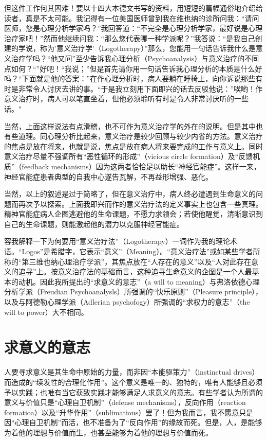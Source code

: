 \documentclass[11pt,oneside]{book}
\begin{document}
\begin{common-format}
但这件工作何其困难！要以十四大本德文书写的资料，用短短的篇幅通俗地介绍给读者，真是不太可能。我记得有一位美国医师曾到我在维也纳的诊所问我：“请问医师，您是心理分析学家吗？”我回答道：“不完全是心理分析学家，最好说是心理治疗家吧！”然而他继续问我：“那么您代表哪一种学派呢？”我答说：“是我自己创建的学说，称为'意义治疗学'（Logotherapy）”那么，您能用一句话告诉我什么是意义治疗学吗？“他又问”至少告诉我心理分析（Psychoanalysis）与意义治疗的不同点如何？“”好吧！“我说；”但是首先请你用一句话告诉我心理分析的本质是什么好吗？“下面就是他的答案：”在作心理分析时，病人要躺在睡椅上，向你诉说那些有时是非常令人讨厌去讲的事。“于是我立刻用下面即兴的话去反驳他说：”唉哟！作意义治疗时，病人可以笔直坐着，但他必须聆听有时是令人非常讨厌听的一些话。"

当然，上面这样说法有点滑稽，也不可作为意义治疗学的外在的说明。但是其中也有些道理。同心理分析比起来，意义治疗是较少回顾与较少内省的方法。意义治疗的焦点是放在将来，也就是说，焦点是放在病人将来要完成的工作与意义上。同时意义治疗尽量不强调所有“恶性循环的形成”（vicious circle formation）及“反馈机质”（feedback mechanisms）因为这两者恰恰足以助长“神经官能症”。这样一来，神经官能症患者典型的自我中心遂告瓦解，不再益形增强、恶化。

当然，以上的叙述是过于简略了，但在意义治疗中，病人终必遭遇到生命意义的问题而再次予以探索。上面我即兴而作的意义治疗法的定义事实上也包含一些真理。精神官能症病人企图逃避他的生命课题，不愿力求领会；若使他醒觉，清晰意识到自己的生命课题，则能激起他的潜力以克服神经官能症。

容我解释一下为何要用“意义治疗法”（Logotherapy）一词作为我的理论术语。“Logos”是希腊字，它表示“意义”（Meaning）。“意义治疗法”或如某些学者所称的“第三维也纳心理治疗学派”，其焦点放在“人存在的意义”以及“人对此存在意义的追寻”上。按意义治疗法的基础而言，这种追寻生命意义的企图是一个人最基本的动机。因此我所提出的“求意义的意志”（a will to meaning）与弗洛依德心理分析学派（Freudian Psychoanalysls）所强调的“快乐原则”（Pleasure principle），以及与阿德勒心理学派（Adlerian psychofogy）所强调的“求权力的意志”（the will to power）大不相同。


\section{求意义的意志}
人要寻求意义是其生命中原始的力量，而非因“本能驱策力”（instinctual drives）而造成的“续发性的合理化作用”。这个意义是唯一的、独特的，唯有人能够且必须予以实践；也唯有当它获致实践才能够满足人求意义的意志。有些学者认为所谓的意义与价值只是“心理自卫机制”（defense mechanisms），反向作用（reaction formatioa）以及“升华作用”（sublimatious）罢了！但为我而言，我不愿意只是因“心理自卫机制”而活，也不准备为了“反向作用”的缘故而死。但是，人，是能够为着他的理想与价值而生，也甚至能够为着他的理想与价值而死。


\end{common-format}
\end{document}
